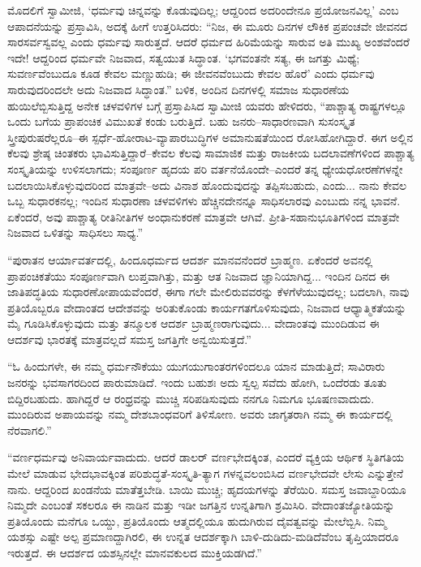 ಮೊದಲಿಗೆ ಸ್ವಾಮೀಜಿ, ‘ಧರ್ಮವು ಚಿನ್ನವನ್ನು ಕೊಡುವುದಿಲ್ಲ; ಆದ್ದರಿಂದ ಅದರಿಂದೇನೂ ಪ್ರಯೋಜನವಿಲ್ಲ’ ಎಂಬ ಆಪಾದನೆಯನ್ನು ಪ್ರಸ್ತಾವಿಸಿ, ಅದಕ್ಕೆ ಹೀಗೆ ಉತ್ತರಿಸಿದರು: “ನಿಜ, ಈ ಮೂರು ದಿನಗಳ ಲೌಕಿಕ ಪ್ರಪಂಚವೇ ಜೀವನದ ಸಾರಸರ್ವಸ್ವವಲ್ಲ ಎಂದು ಧರ್ಮವು ಸಾರುತ್ತದೆ. ಆದರೆ ಧರ್ಮದ ಹಿರಿಮೆಯನ್ನು ಸಾರುವ ಅತಿ ಮುಖ್ಯ ಅಂಶವೆಂದರೆ ಇದೇ! ಆದ್ದರಿಂದ ಧರ್ಮವೇ ನಿಜವಾದ, ಸತ್ವಯುತ ಸಿದ್ಧಾಂತ. ‘ಭಗವಂತನೇ ಸತ್ಯ, ಈ ಜಗತ್ತು ಮಿಥ್ಯೆ; ಸುವರ್ಣವೆಂಬುದೂ ಕೂಡ ಕೇವಲ ಮಣ್ಣುಹುಡಿ; ಈ ಜೀವನವೆಂಬುದು ಕೇವಲ ಹೊರೆ’ ಎಂದು ಧರ್ಮವು ಸಾರುವುದರಿಂದಲೇ ಅದು ನಿಜವಾದ ಸಿದ್ಧಾಂತ.” ಬಳಿಕ, ಅಂದಿನ ದಿನಗಳಲ್ಲಿ ಸಮಾಜ ಸುಧಾರಣೆಯ ಹುಯಿಲೆಬ್ಬಿಸುತ್ತಿದ್ದ ಅನೇಕ ಚಳವಳಿಗಳ ಬಗ್ಗೆ ಪ್ರಸ್ತಾಪಿಸಿದ ಸ್ವಾಮೀಜಿ ಯವರು ಹೇಳಿದರು, “ಪಾಶ್ಚಾತ್ಯ ರಾಷ್ಟ್ರಗಳಲ್ಲೂ ಒಂದು ಬಗೆಯ ಪ್ರಾಪಂಚಿಕ ವಿಮುಖತೆ ಕಂಡು ಬರುತ್ತಿದೆ. ಬಹು ಜನರು–ಸಾಧಾರಣವಾಗಿ ಸುಸಂಸ್ಕೃತ ಸ್ತ್ರೀಪುರುಷರೆಲ್ಲರೂ–ಈ ಸ್ಪರ್ಧೆ-ಹೋರಾಟ-ವ್ಯಾಪಾರಬುದ್ಧಿಗಳ ಅಮಾನುಷತೆಯಿಂದ ರೋಸಿಹೋಗಿದ್ದಾರೆ. ಈಗ ಅಲ್ಲಿನ ಕೆಲವು ಶ್ರೇಷ್ಠ ಚಿಂತಕರು ಭಾವಿಸುತ್ತಿದ್ದಾರೆ–ಕೇವಲ ಕೆಲವು ಸಾಮಾಜಿಕ ಮತ್ತು ರಾಜಕೀಯ ಬದಲಾವಣೆಗಳಿಂದ ಪಾಶ್ಚಾತ್ಯ ಸಂಸ್ಕೃತಿಯನ್ನು ಉಳಿಸಲಾಗದು; ಸಂಪೂರ್ಣ ಹೃದಯ ಪರಿ ವರ್ತನೆಯೊಂದೇ–ಎಂದರೆ ತನ್ನ ಧ್ಯೇಯಧೋರಣೆಗಳನ್ನೇ ಬದಲಾಯಿಸಿಕೊಳ್ಳುವುದರಿಂದ ಮಾತ್ರವೇ–ಅದು ವಿನಾಶ ಹೊಂದುವುದನ್ನು ತಪ್ಪಿಸಬಹುದು, ಎಂದು... ನಾನು ಕೇವಲ ಒಬ್ಬ ಸುಧಾರಕನಲ್ಲ; ಇಂದಿನ ಸುಧಾರಣಾ ಚಳವಳಿಗಳು ಹೆಚ್ಚಿನದೇನನ್ನೂ ಸಾಧಿಸಲಾರವು ಎಂಬುದು ನನ್ನ ಭಾವನೆ. ಏಕೆಂದರೆ, ಅವು ಪಾಶ್ಚಾತ್ಯ ರೀತಿನೀತಿಗಳ ಅಂಧಾನುಕರಣೆ ಮಾತ್ರವೇ ಆಗಿವೆ. ಪ್ರೀತಿ-ಸಹಾನುಭೂತಿಗಳಿಂದ ಮಾತ್ರವೇ ನಿಜವಾದ ಒಳಿತನ್ನು ಸಾಧಿಸಲು ಸಾಧ್ಯ.”

“ಪುರಾತನ ಆರ್ಯಾವರ್ತದಲ್ಲಿ, ಹಿಂದೂಧರ್ಮದ ಆದರ್ಶ ಮಾನವನೆಂದರೆ ಬ್ರಾಹ್ಮಣ. ಏಕೆಂದರೆ ಅವನಲ್ಲಿ ಪ್ರಾಪಂಚಿಕತೆಯು ಸಂಪೂರ್ಣವಾಗಿ ಲುಪ್ತವಾಗಿತ್ತು, ಮತ್ತು ಆತ ನಿಜವಾದ ಜ್ಞಾನಿಯಾಗಿದ್ದ... ಇಂದಿನ ದಿನದ ಈ ಜಾತಿಪದ್ಧತಿಯ ಸುಧಾರಣೋಪಾಯವೆಂದರೆ, ಈಗಾ ಗಲೇ ಮೇಲಿರುವವರನ್ನು ಕೆಳಗೆಳೆಯುವುದಲ್ಲ; ಬದಲಾಗಿ, ನಾವು ಪ್ರತಿಯೊಬ್ಬರೂ ವೇದಾಂತದ ಆದೇಶವನ್ನು ಅರಿತುಕೊಂಡು ಕಾರ್ಯಗತಗೊಳಿಸುವುದು, ನಿಜವಾದ ಆಧ್ಯಾತ್ಮಿಕತೆಯನ್ನು ಮೈ ಗೂಡಿಸಿಕೊಳ್ಳುವುದು ಮತ್ತು ತನ್ಮೂಲಕ ಆದರ್ಶ ಬ್ರಾಹ್ಮಣರಾಗುವುದು... ವೇದಾಂತವು ಮುಂದಿಡುವ ಈ ಆದರ್ಶವು ಭಾರತಕ್ಕೆ ಮಾತ್ರವಲ್ಲದೆ ಸಮಸ್ತ ಜಗತ್ತಿಗೇ ಅನ್ವಯಿಸುತ್ತದೆ.”

“ಓ ಹಿಂದುಗಳೇ, ಈ ನಮ್ಮ ಧರ್ಮನೌಕೆಯು ಯುಗಯುಗಾಂತರಗಳಿಂದಲೂ ಯಾನ ಮಾಡುತ್ತಿದೆ; ಸಾವಿರಾರು ಜನರನ್ನು ಭವಸಾಗರದಿಂದ ಪಾರುಮಾಡಿದೆ. ಇಂದು ಬಹುಶಃ ಅದು ಸ್ವಲ್ಪ ಸವೆದು ಹೋಗಿ, ಒಂದೆರಡು ತೂತು ಬಿದ್ದಿರಬಹುದು. ಹಾಗಿದ್ದರೆ ಆ ರಂಧ್ರವನ್ನು ಮುಚ್ಚಿ ಸರಿಪಡಿಸುವುದು ನನಗೂ ನಿಮಗೂ ಭೂಷಣವಾದುದು. ಮುಂದಿರುವ ಅಪಾಯವನ್ನು ನಮ್ಮ ದೇಶಬಾಂಧವರಿಗೆ ತಿಳಿಸೋಣ. ಅವರು ಜಾಗೃತರಾಗಿ ನಮ್ಮ ಈ ಕಾರ್ಯದಲ್ಲಿ ನೆರವಾಗಲಿ.”

“ವರ್ಣಧರ್ಮವು ಅನಿವಾರ್ಯವಾದುದು. ಆದರೆ ಡಾಲರ್ ವರ್ಣಭೇದಕ್ಕಿಂತ, ಎಂದರೆ ವ್ಯಕ್ತಿಯ ಆರ್ಥಿಕ ಸ್ಥಿತಿಗತಿಯ ಮೇಲೆ ಮಾಡುವ ಭೇದಭಾವಕ್ಕಿಂತ ಪರಿಶುದ್ಧತೆ-ಸಂಸ್ಕೃತಿ-ತ್ಯಾಗ ಗಳನ್ನವಲಂಬಿಸಿದ ವರ್ಣಭೇದವೇ ಲೇಸು ಎನ್ನುತ್ತೇನೆ ನಾನು. ಆದ್ದರಿಂದ ಖಂಡನೆಯ ಮಾತೆತ್ತಬೇಡಿ. ಬಾಯಿ ಮುಚ್ಚಿ; ಹೃದಯಗಳನ್ನು ತೆರೆಯಿರಿ. ಸಮಸ್ತ ಜವಾಬ್ದಾರಿಯೂ ನಿಮ್ಮದೇ ಎಂಬಂತೆ ಸಕಲರೂ ಈ ನಾಡಿನ ಮತ್ತು ಇಡೀ ಜಗತ್ತಿನ ಉನ್ನತಿಗಾಗಿ ಶ್ರಮಿಸಿರಿ. ವೇದಾಂತಜ್ಯೋತಿಯನ್ನು ಪ್ರತಿಯೊಂದು ಮನೆಗೂ ಒಯ್ದು, ಪ್ರತಿಯೊಂದು ಆತ್ಮದಲ್ಲಿಯೂ ಹುದುಗಿರುವ ದೈವತ್ವವನ್ನು ಮೇಲೆಬ್ಬಿಸಿ. ನಿಮ್ಮ ಯಶಸ್ಸು ಎಷ್ಟೇ ಅಲ್ಪ ಪ್ರಮಾಣದ್ದಾಗಿರಲಿ, ಈ ಉನ್ನತ ಆದರ್ಶಕ್ಕಾಗಿ ಬಾಳಿ-ದುಡಿದು-ಮಡಿದೆವೆಂಬ ತೃಪ್ತಿಯಾದರೂ ಇರುತ್ತದೆ. ಈ ಆದರ್ಶದ ಯಶಸ್ಸಿನಲ್ಲೇ ಮಾನವಕುಲದ ಮುಕ್ತಿಯಡಗಿದೆ.”

